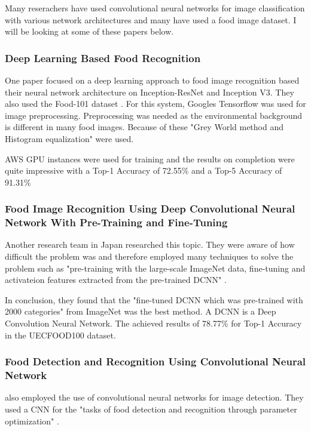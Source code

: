 Many reserachers have used convolutional neural networks for image
classification with various network architectures and many have used a food image dataset. I will be looking at
some of these papers below.

\subsubsection*{Deep Learning Based Food Recognition}
One paper focused on a deep learning approach to food image recognition based
their neural network architecture on Inception-ResNet and Inception V3. They
also used the Food-101 dataset \textcite{deepLearning}. For this system, Googles
Tensorflow was used for image preprocessing. Preprocessing was needed as the
environmental background is different in many food images. Because of these
"Grey World method and Histogram equalization" \textcite{deepLearning} were
used.

AWS GPU instances were used for training and the results on completion were
quite impressive with a Top-1 Accuracy of 72.55\% and a Top-5 Accuracy of
91.31\% \textcite{deepLearning}

\subsubsection*{Food Image Recognition Using Deep Convolutional Neural Network
With Pre-Training and Fine-Tuning}
Another research team in Japan researched this topic. They were aware of how
difficult the problem was and therefore employed many techniques to solve the
problem such as "pre-training with the large-scale ImageNet data, fine-tuning
and activateion features extracted from the pre-trained DCNN"
\textcite{yanaiFood}. 

In conclusion, they found that the "fine-tuned DCNN which was pre-trained
with 2000 categories" \textcite{yanaiFood} from ImageNet was the best method. A
DCNN is a Deep Convolution Neural Network. The achieved results of 78.77\% for
Top-1 Accuracy in the UECFOOD100 dataset.

\subsubsection*{Food Detection and Recognition Using Convolutional Neural Network}
\textcite{kagayaFood} also employed the use of convolutional neural networks for
image detection. They used a CNN for the "tasks of food detection and recognition
through parameter optimization" \textcite{kagayaFood}.

